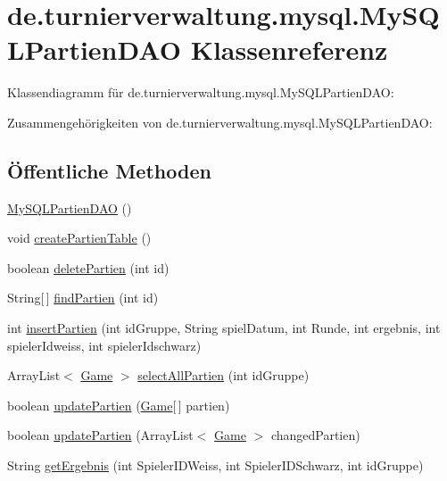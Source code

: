 \hypertarget{classde_1_1turnierverwaltung_1_1mysql_1_1_my_s_q_l_partien_d_a_o}{}\section{de.\+turnierverwaltung.\+mysql.\+My\+S\+Q\+L\+Partien\+D\+AO Klassenreferenz}
\label{classde_1_1turnierverwaltung_1_1mysql_1_1_my_s_q_l_partien_d_a_o}


Klassendiagramm für de.\+turnierverwaltung.\+mysql.\+My\+S\+Q\+L\+Partien\+D\+AO\+:


Zusammengehörigkeiten von de.\+turnierverwaltung.\+mysql.\+My\+S\+Q\+L\+Partien\+D\+AO\+:
\subsection*{Öffentliche Methoden}
\begin{DoxyCompactItemize}
\item 
\hyperlink{classde_1_1turnierverwaltung_1_1mysql_1_1_my_s_q_l_partien_d_a_o_a2676d47a6c186c81f7420f13971981d1}{My\+S\+Q\+L\+Partien\+D\+AO} ()
\item 
void \hyperlink{classde_1_1turnierverwaltung_1_1mysql_1_1_my_s_q_l_partien_d_a_o_a8b7140dd22fc4f9cf84fc3034be1ed19}{create\+Partien\+Table} ()
\item 
boolean \hyperlink{classde_1_1turnierverwaltung_1_1mysql_1_1_my_s_q_l_partien_d_a_o_aef5ad6e81e357e6da465d98dce496eec}{delete\+Partien} (int id)
\item 
String\mbox{[}$\,$\mbox{]} \hyperlink{classde_1_1turnierverwaltung_1_1mysql_1_1_my_s_q_l_partien_d_a_o_a35a442b805cb0d35ab35bf3443943905}{find\+Partien} (int id)
\item 
int \hyperlink{classde_1_1turnierverwaltung_1_1mysql_1_1_my_s_q_l_partien_d_a_o_a5145688ab325f0ad5b43f58c660ac917}{insert\+Partien} (int id\+Gruppe, String spiel\+Datum, int Runde, int ergebnis, int spieler\+Idweiss, int spieler\+Idschwarz)
\item 
Array\+List$<$ \hyperlink{classde_1_1turnierverwaltung_1_1model_1_1_game}{Game} $>$ \hyperlink{classde_1_1turnierverwaltung_1_1mysql_1_1_my_s_q_l_partien_d_a_o_aa066d144c6c95600923181b157dd5970}{select\+All\+Partien} (int id\+Gruppe)
\item 
boolean \hyperlink{classde_1_1turnierverwaltung_1_1mysql_1_1_my_s_q_l_partien_d_a_o_a12919ec5f4996c7d4f1fb363e5fe2bf3}{update\+Partien} (\hyperlink{classde_1_1turnierverwaltung_1_1model_1_1_game}{Game}\mbox{[}$\,$\mbox{]} partien)
\item 
boolean \hyperlink{classde_1_1turnierverwaltung_1_1mysql_1_1_my_s_q_l_partien_d_a_o_ae66ef4bd718737daea815fb23a324145}{update\+Partien} (Array\+List$<$ \hyperlink{classde_1_1turnierverwaltung_1_1model_1_1_game}{Game} $>$ changed\+Partien)
\item 
String \hyperlink{classde_1_1turnierverwaltung_1_1mysql_1_1_my_s_q_l_partien_d_a_o_a8238e5a78f2dc354fbd40ad58f88a8d3}{get\+Ergebnis} (int Spieler\+I\+D\+Weiss, int Spieler\+I\+D\+Schwarz, int id\+Gruppe)
\end{DoxyCompactItemize}


